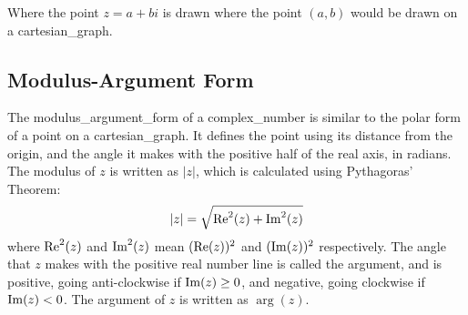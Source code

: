         \begin{center}
        \end{center}

        Where the point $z=a+bi$ is drawn where the point $(a, b)$ would be drawn on a \gls{cartesian_graph}.
        
    \subsection{Modulus-Argument Form}
        The \gls{modulus_argument_form} of a \gls{complex_number} is similar to the polar form of a point on a \gls{cartesian_graph}.
        It defines the point using its distance from the origin, and the angle it makes with the positive half of the real axis, in \glspl{radian}.
        The \gls{modulus} of $z$ is written as $|z|$, which is calculated using Pythagoras' Theorem:
        \begin{equation}
            |z|=\sqrt{\operatorname{Re}^2(z)+\operatorname{Im}^2(z)}
        \end{equation}
        where $\operatorname{Re}^2(z)$ and $\operatorname{Im}^2(z)$ mean $(\operatorname{Re}(z))^2$ and $(\operatorname{Im}(z))^2$ respectively.
        The angle that $z$ makes with the positive real number line is called the \gls{argument}, and is positive, going anti-clockwise if $\operatorname{Im}(z)\ge0$, and negative, going clockwise if $\operatorname{Im}(z)<0$.
        The \gls{argument} of $z$ is written as $\arg(z)$.

